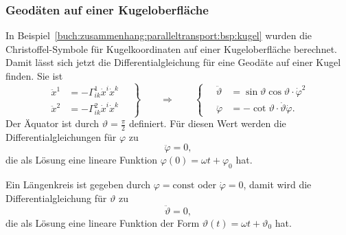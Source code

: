 \subsubsection{Geodäten auf einer Kugeloberfläche}
In Beispiel~\ref{buch:zusammenhang:paralleltransport:bsp:kugel}
wurden die Christoffel-Symbole für Kugelkoordinaten auf einer
Kugeloberfläche berechnet.
%
Damit lässt sich jetzt die Differentialgleichung für eine Geodäte auf
einer Kugel finden.
Sie ist
\begin{equation}
\left.
\begin{aligned}
\ddot{x}^1 &= -\Gamma^1_{ik}\dot{x}^i\dot{x}^k
\\
\ddot{x}^2 &= -\Gamma^2_{ik}\dot{x}^i\dot{x}^k
\end{aligned}
\quad
\right\}
\qquad\Rightarrow\qquad
\left\{
\quad
\begin{aligned}
\ddot{\vartheta}
&=
\sin\vartheta\cos\vartheta \cdot \dot{\varphi}^2
\\
\ddot{\varphi}
&=
-\cot\vartheta \cdot \dot{\vartheta}\dot{\varphi}.
\end{aligned}
\right.
\label{buch:zusammenhang:geodaeten:kugeldgl}
\end{equation}
Der Äquator ist durch $\vartheta=\frac{\pi}2$ definiert.
Für diesen Wert werden die Differentialgleichungen für $\varphi$ zu
\[
\ddot{\varphi}=0,
\]
die als Lösung eine lineare Funktion
$\varphi(0)=\omega t +\varphi_0$ hat.

Ein Längenkreis ist gegeben durch $\varphi=\text{const}$ oder
$\dot{\varphi}=0$, damit wird die Differentialgleichung für $\vartheta$
zu
\[
\ddot{\vartheta} = 0,
\]
die als Lösung eine lineare Funktion der Form
$\vartheta(t) = \omega t + \vartheta_0$ hat.

